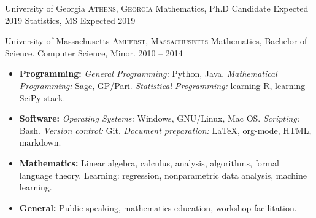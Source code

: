 \documentclass[10pt,a4paper]{article}
\begin{document}
\headedsection
  {University of Georgia}
  {\textsc{Athens, Georgia}} {%
  \headedsubsection
    {Mathematics, Ph.D Candidate}
    {Expected 2019}
    {}
    \headedsubsection
    {Statistics, MS}
    {Expected 2019}
    {}
}

\headedsection
  {University of Massachusetts}
  {\textsc{Amherst, Massachusetts}} {%
  \headedsubsection
    {Mathematics, Bachelor of Science. Computer Science, Minor.}
    {2010 -- 2014}
    {}
}

\spacedhrule{0.5em}{-0.4em}


\begin{itemize}
  \item \textbf{Programming:} \textit{General Programming:} Python, Java. \textit{Mathematical Programming:} Sage, GP/Pari. \textit{Statistical Programming:} learning R, learning SciPy stack.
  \item \textbf{Software:} \textit{Operating Systems:} Windows, GNU/Linux, Mac OS. \textit{Scripting:} Bash. \textit{Version control:} Git. \textit{Document preparation:} \LaTeX, org-mode, HTML, markdown.
   \item \textbf{Mathematics:} Linear algebra, calculus, analysis, algorithms, formal language theory. Learning: regression, nonparametric data analysis, machine learning.
   \item \textbf{General:} Public speaking, mathematics education, workshop facilitation.
\end{itemize}


\spacedhrule{0.5em}{-0.4em}
\end{document}
